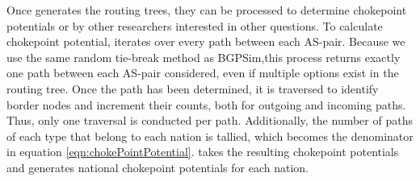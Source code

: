
\par Once \toolname{} generates the routing trees, they can be processed to
determine chokepoint potentials or by other researchers interested in other questions. To calculate chokepoint potential, \toolname{} iterates over every path
between each AS-pair. Because we use the same random tie-break method as BGPSim,this process returns 
exactly one path between each AS-pair considered, even if multiple options exist in the
routing tree. Once the path has been determined, it is traversed to identify border nodes and increment their counts, both
for outgoing and incoming paths.  Thus, only one traversal is conducted
per path. Additionally, the number of paths of each type that belong to each
nation is tallied, which becomes the denominator in equation
\ref{eqn:chokePointPotential}.  \toolname{} takes the resulting chokepoint
potentials and generates national chokepoint potentials for each nation.


